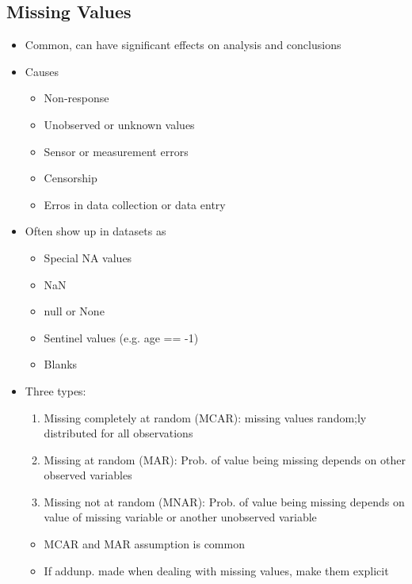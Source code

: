 \documentclass[a4paper]{article}
\begin{document}
\subsection{Missing Values}
\begin{itemize}
	\item Common, can have significant effects on analysis and conclusions
	\item Causes
	\begin{itemize}
		\item Non-response
		\item Unobserved or unknown values
		\item Sensor or measurement errors
		\item Censorship
		\item Erros in data collection or data entry
	\end{itemize}
	\item Often show up in datasets as
	\begin{itemize}
		\item Special NA values
		\item NaN
		\item null or None
		\item Sentinel values (e.g. age ==  -1)
		\item Blanks
	\end{itemize}
	\item Three types:
	\begin{enumerate}
		\item Missing completely at random (MCAR): missing values
			random;ly distributed for all observations
		\item Missing at random (MAR): Prob. of value being missing
			depends on other observed variables
		\item Missing not at random (MNAR): Prob. of value being missing
			depends on value of missing variable or another
			unobserved variable
	\end{enumerate}
	\begin{itemize}
		\item MCAR and MAR assumption is common
		\item If addunp. made when dealing with missing values, make
			them explicit
	\end{itemize}
\end{itemize}
\end{document}
